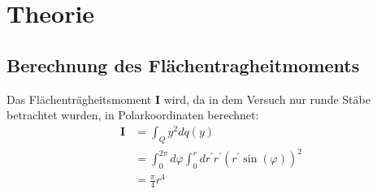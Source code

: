 \section{Theorie}
\label{sec:Theorie}

\subsection{Berechnung des Flächentragheitmoments}
\label{sec:flaechentraegheitsmoment}
Das Flächenträgheitsmoment $\mathbf{I}$ wird, da in dem Versuch nur runde Stäbe betrachtet wurden,
in Polarkoordinaten berechnet:
\begin{align}
	\mathbf{I} 
	&= \int_Q y^2 dq(y) 
	\\
	&= \int_0^{2\pi} d\varphi \int_0^r dr^\prime r^\prime 
	\left( r^\prime\sin(\varphi) \right)^2
	\\
	&= \frac{\pi}{4} r^4
\end{align}

\cite{sample}
